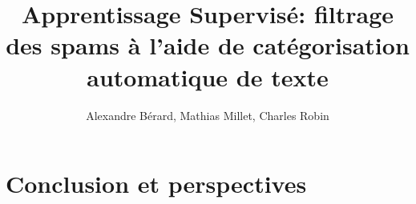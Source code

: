 \documentclass{article}
\begin{document}
\title{Apprentissage Supervisé: filtrage des spams à l'aide de catégorisation
automatique de texte}

\author{Alexandre Bérard, Mathias Millet, Charles Robin}
\maketitle
\begin{abstract}
\end{abstract}
\vspace{0.5em}



\section{Conclusion et perspectives}
\nocite{*}


\end{document}
